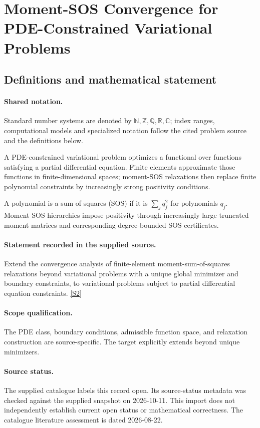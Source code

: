 \documentclass[11pt]{article}
\newcommand{\sref}[2]{\hyperlink{source:#1:#2}{[S#2]}}
\begin{document}
\section{Moment-SOS Convergence for PDE-Constrained Variational Problems}\label{statement}

\subsection{Definitions and mathematical statement}

\paragraph{Shared notation.}Standard number systems are denoted by $\mathbb N,\mathbb Z,\mathbb Q,\mathbb R,\mathbb C$; index ranges, computational models and specialized notation follow the cited problem source and the definitions below.


A PDE-constrained variational problem optimizes a functional over functions satisfying a partial differential equation. Finite elements approximate those functions in finite-dimensional spaces; moment-SOS relaxations then replace finite polynomial constraints by increasingly strong positivity conditions.

A polynomial is a sum of squares (SOS) if it is $\sum_j q_j^2$ for polynomials $q_j$. Moment-SOS hierarchies impose positivity through increasingly large truncated moment matrices and corresponding degree-bounded SOS certificates.
\paragraph{Statement recorded in the supplied source.}
Extend the convergence analysis of finite-element moment-sum-of-squares relaxations beyond variational problems with a unique global minimizer and boundary constraints, to variational problems subject to partial differential equation constraints. \sref{statement}{2}
\paragraph{Scope qualification.}
The PDE class, boundary conditions, admissible function space, and relaxation construction are source-specific. The target explicitly extends beyond unique minimizers.
\paragraph{Source status.}
The supplied catalogue labels this record open. Its source-status metadata was checked against the supplied snapshot on 2026-10-11. This import does not independently establish current open status or mathematical correctness. The catalogue literature assessment is dated 2026-08-22.
\end{document}
